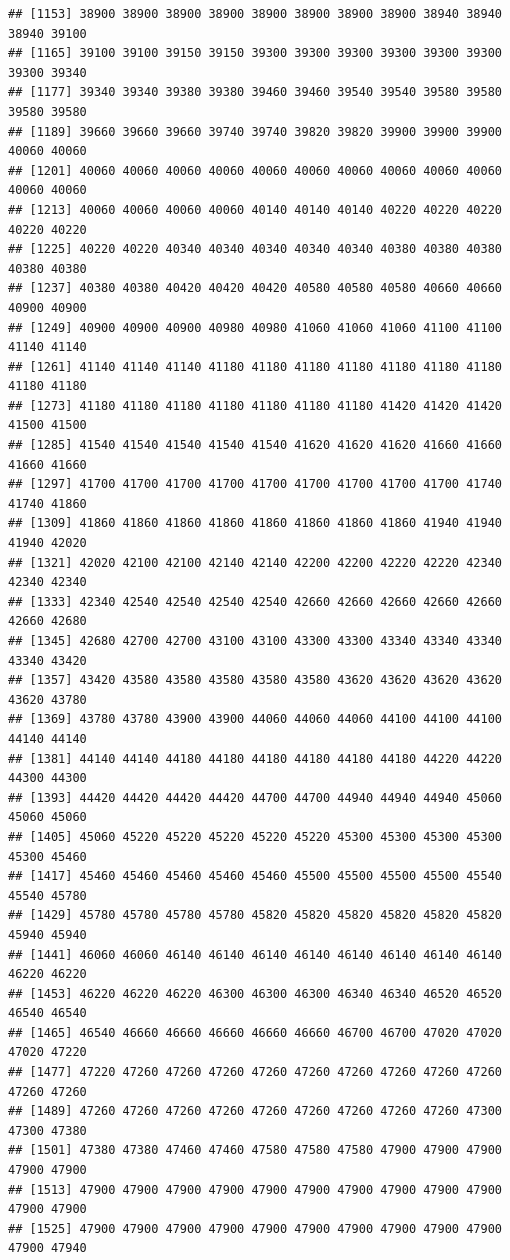 \documentclass[
  12pt,
]{article}
\begin{document}
\begin{verbatim}
## [1153] 38900 38900 38900 38900 38900 38900 38900 38900 38940 38940 38940 39100
## [1165] 39100 39100 39150 39150 39300 39300 39300 39300 39300 39300 39300 39340
## [1177] 39340 39340 39380 39380 39460 39460 39540 39540 39580 39580 39580 39580
## [1189] 39660 39660 39660 39740 39740 39820 39820 39900 39900 39900 40060 40060
## [1201] 40060 40060 40060 40060 40060 40060 40060 40060 40060 40060 40060 40060
## [1213] 40060 40060 40060 40060 40140 40140 40140 40220 40220 40220 40220 40220
## [1225] 40220 40220 40340 40340 40340 40340 40340 40380 40380 40380 40380 40380
## [1237] 40380 40380 40420 40420 40420 40580 40580 40580 40660 40660 40900 40900
## [1249] 40900 40900 40900 40980 40980 41060 41060 41060 41100 41100 41140 41140
## [1261] 41140 41140 41140 41180 41180 41180 41180 41180 41180 41180 41180 41180
## [1273] 41180 41180 41180 41180 41180 41180 41180 41420 41420 41420 41500 41500
## [1285] 41540 41540 41540 41540 41540 41620 41620 41620 41660 41660 41660 41660
## [1297] 41700 41700 41700 41700 41700 41700 41700 41700 41700 41740 41740 41860
## [1309] 41860 41860 41860 41860 41860 41860 41860 41860 41940 41940 41940 42020
## [1321] 42020 42100 42100 42140 42140 42200 42200 42220 42220 42340 42340 42340
## [1333] 42340 42540 42540 42540 42540 42660 42660 42660 42660 42660 42660 42680
## [1345] 42680 42700 42700 43100 43100 43300 43300 43340 43340 43340 43340 43420
## [1357] 43420 43580 43580 43580 43580 43580 43620 43620 43620 43620 43620 43780
## [1369] 43780 43780 43900 43900 44060 44060 44060 44100 44100 44100 44140 44140
## [1381] 44140 44140 44180 44180 44180 44180 44180 44180 44220 44220 44300 44300
## [1393] 44420 44420 44420 44420 44700 44700 44940 44940 44940 45060 45060 45060
## [1405] 45060 45220 45220 45220 45220 45220 45300 45300 45300 45300 45300 45460
## [1417] 45460 45460 45460 45460 45460 45500 45500 45500 45500 45540 45540 45780
## [1429] 45780 45780 45780 45780 45820 45820 45820 45820 45820 45820 45940 45940
## [1441] 46060 46060 46140 46140 46140 46140 46140 46140 46140 46140 46220 46220
## [1453] 46220 46220 46220 46300 46300 46300 46340 46340 46520 46520 46540 46540
## [1465] 46540 46660 46660 46660 46660 46660 46700 46700 47020 47020 47020 47220
## [1477] 47220 47260 47260 47260 47260 47260 47260 47260 47260 47260 47260 47260
## [1489] 47260 47260 47260 47260 47260 47260 47260 47260 47260 47300 47300 47380
## [1501] 47380 47380 47460 47460 47580 47580 47580 47900 47900 47900 47900 47900
## [1513] 47900 47900 47900 47900 47900 47900 47900 47900 47900 47900 47900 47900
## [1525] 47900 47900 47900 47900 47900 47900 47900 47900 47900 47900 47900 47940

\end{verbatim}
\end{document}
